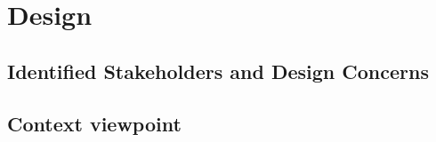 \section{Design}

\tableofcontents

\subsection{Identified Stakeholders and Design Concerns}

\subsection{Context viewpoint}

% 
% 
%
% 
% 
% 
